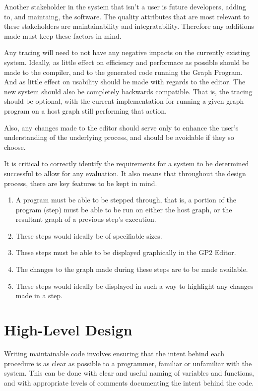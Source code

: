 \documentclass{UoYCSproject}
\begin{document}
Another stakeholder in the system that isn't a user is future developers, adding to, and maintaing, the software. The quality attributes that are most relevant to these stakeholders are maintainability and integratability. Therefore any additions made must keep these factors in mind.

Any tracing will need to not have any negative impacts on the currently existing system. Ideally, as little effect on efficiency and performace as possible should be made to the compiler, and to the generated code running the Graph Program. And as little effect on usability should be made with regards to the editor. The new system should also be completely backwards compatible. That is, the tracing should be optional, with the current implementation for running a given graph program on a host graph still performing that action.

Also, any changes made to the editor should serve only to enhance the user's understanding of the underlying process, and should be avoidable if they so choose.

It is critical to correctly identify the requirements for a system to be determined successful to allow for any evaluation. It also means that throughout the design process, there are key features to be kept in mind.
\begin{enumerate}
	\item A program must be able to be stepped through, that is, a portion of the program (step) must be able to be run on either the host graph, or the resultant graph of a previous step's execution.
	\item These steps would ideally be of specifiable sizes.
	\item These steps must be able to be displayed graphically in the GP2 Editor.
	\item The changes to the graph made during these steps are to be made available.
	\item These steps would ideally be displayed in such a way to highlight any changes made in a step.
\end{enumerate}

\section{High-Level Design}
Writing maintainable code involves ensuring that the intent behind each procedure is as clear as possible to a programmer, familiar or unfamiliar with the system. This can be done with clear and useful naming of variables and functions, and with appropriate levels of comments documenting the intent behind the code.
\end{document}
